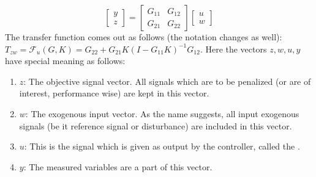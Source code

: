 \documentclass[a4paper,12pt]{article}
\begin{document}
				\[
				\begin{bmatrix} 
				y\\
				z
				\end{bmatrix} = \begin{bmatrix} G_{11} & G_{12} \\ G_{21} & G_{22}\end{bmatrix} \begin{bmatrix} u \\ w\end{bmatrix}
				\]
				The transfer function comes out as follows (the notation changes as well):
				$T_{zw}=\mathscr{F}_{u}(G,K) = G_{22}+G_{21}K(I-G_{11}K)^{-1}G_{12}$. Here the vectors $z,w,u,y$ have special meaning as follows:
				\begin{enumerate}
				\item $z$: The objective signal vector. All signals which are to be penalized (or are of interest, performance wise) are kept in this vector.
				\item $w$: The exogenous input vector. As the name suggests, all input exogenous signals (be it reference signal or disturbance) are included in this vector.
				\item $u$: This is the signal which is given as output by the controller, called the .
				\item $y$: The measured variables are a part of this vector. 
				\end{enumerate}
			
\end{document}
